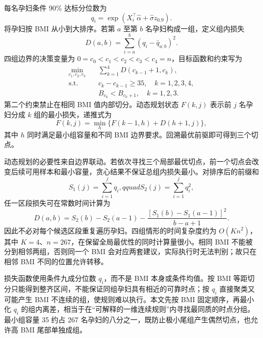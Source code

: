 \documentclass[UTF8,a4paper,12pt]{ctexart}
\begin{document}
每名孕妇条件 90\% 达标分位数为
\begin{equation}
q_i=\exp\!\left(X_i^\top\widehat\alpha+\widehat\sigma z_{0.9}\right).
\label{eq:quantile}
\end{equation}
将孕妇按 BMI 从小到大排序。若第 $a$ 至第 $b$ 名孕妇构成一组，定义组内损失
\begin{equation}
D(a,b)=\sum_{i=a}^{b}(q_i-\bar q_{a:b})^2.
\label{eq:segmentloss}
\end{equation}
四组边界的决策变量为 $0=c_0<c_1<c_2<c_3<c_4=n$，目标函数和约束写为
\begin{align}
\min_{c_1,c_2,c_3}\quad & \sum_{k=1}^{4}D(c_{k-1}+1,c_k), \label{eq:dpobjective}\\
\text{s.t.}\quad & c_k-c_{k-1}\ge35,\quad k=1,2,3,4, \nonumber\\
& B_{c_k}<B_{c_k+1},\quad k=1,2,3. \label{eq:dpconstraints}
\end{align}
第二个约束禁止在相同 BMI 值内部切分。动态规划状态 $F(k,j)$ 表示前 $j$ 名孕妇分成 $k$ 组的最小损失，递推式为
\begin{equation}
F(k,j)=\min_{h}\{F(k-1,h)+D(h+1,j)\},
\label{eq:dprecursion}
\end{equation}
其中 $h$ 同时满足最小组容量和不同 BMI 边界要求。回溯最优前驱即可得到三个切点。

动态规划的必要性来自边界联动。若依次寻找三个局部最优切点，前一个切点会改变后续可用样本和最小容量，贪心结果不保证总组内损失最小。对排序后的前缀和
\begin{equation}
S_1(j)=\sum_{i=1}^{j}q_i,qquad S_2(j)=\sum_{i=1}^{j}q_i^2,
\label{eq:prefix}
\end{equation}
任一区段损失可在常数时间计算为
\begin{equation}
D(a,b)=S_2(b)-S_2(a-1)-
\frac{[S_1(b)-S_1(a-1)]^2}{b-a+1}.
\label{eq:fastloss}
\end{equation}
因此不必对每个候选区段重复遍历孕妇。四组情形的时间复杂度约为 $O(Kn^2)$，其中 $K=4$、$n=267$，在保留全局最优性的同时计算量很小。相同 BMI 不能被分到相邻两组，否则同一个 BMI 会对应两套建议，实际执行时无法判别；故只在相邻 BMI 不同的位置允许转移。

损失函数使用条件九成分位数 $q_i$，而不是 BMI 本身或条件均值。按 BMI 等距切分只能得到整齐区间，不能保证同组孕妇具有相近的可靠时点；按 $q_i$ 直接聚类又可能产生 BMI 不连续的组，使规则难以执行。本文先按 BMI 固定顺序，再最小化 $q_i$ 的组内离差，相当于在“可解释的一维连续规则”内寻找最同质的时点分组。最小组容量 35 约占 267 名孕妇的八分之一，既防止极小尾组产生偶然切点，也允许高 BMI 尾部单独成组。
\end{document}
